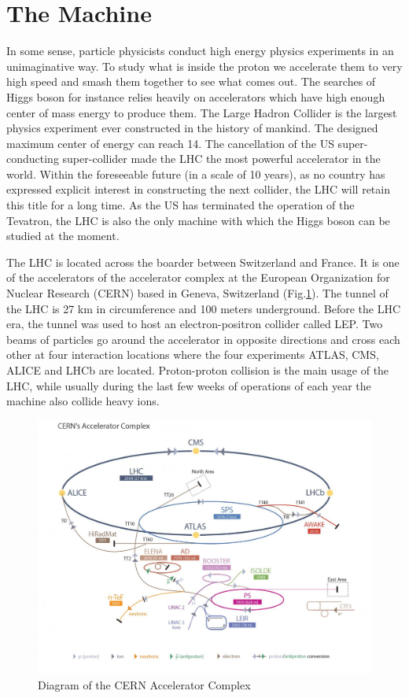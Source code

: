 \section{The Machine}

In some sense, particle physicists conduct high energy physics experiments in an unimaginative way. To study what is inside the proton we accelerate them to very high speed and smash them together to see what comes out. The searches of Higgs boson for instance relies heavily on accelerators which have high enough center of mass energy to produce them. The Large Hadron Collider is the largest physics experiment ever constructed in the history of mankind. The designed maximum center of energy can reach 14\tev. The cancellation of the US super-conducting super-collider made the LHC the most powerful accelerator in the world. Within the foreseeable future (in a scale of 10 years), as no country has expressed explicit interest in constructing the next collider, the LHC will retain this title for a long time. As the US has terminated the operation of the Tevatron, the LHC is also the only machine with which the Higgs boson can be studied at the moment.

The LHC is located across the boarder between Switzerland and France. It is one of the accelerators of the accelerator complex at the European Organization for Nuclear Research (CERN) based in Geneva, Switzerland (Fig.\ref{fig:lhc-CERN}). The tunnel of the LHC is 27 km in circumference and 100 meters underground. Before the LHC era, the tunnel was used to host an electron-positron collider called LEP\cite{refneeded}. Two beams of particles go around the accelerator in opposite directions and cross each other at four interaction locations where the four experiments ATLAS, CMS, ALICE and LHCb are located. Proton-proton collision is the main usage of the LHC, while usually during the last few weeks of operations of each year the machine also collide heavy ions.

\begin{figure}[htpb!]
\begin{center}
  \includegraphics[width=0.7\linewidth]{figures/LHC/LHC_default}
\caption{Diagram of the CERN Accelerator Complex}
\label{fig:lhc-CERN}
\end{center}
\end{figure}


